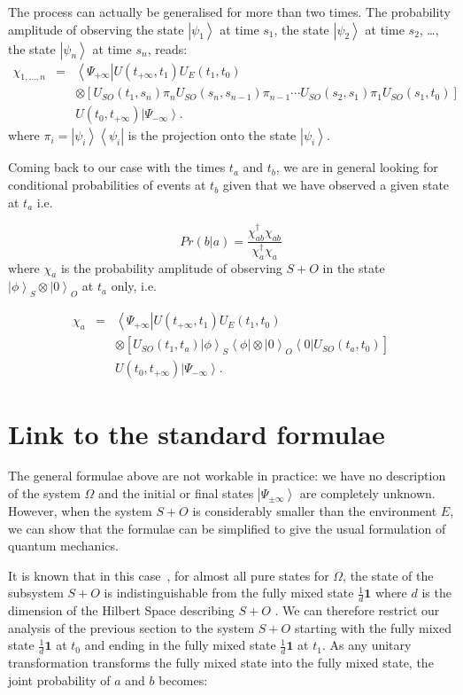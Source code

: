 \documentclass[11pt,amsmath,amssymb,latexsym,a4paper]{article}
\newcommand{\ket}[1]{\left|{#1}\right>}
\newcommand{\ketBasis}[2]{\left|{#1}\right>_{#2}}
\newcommand{\ketbraBasis}[3]{\left|{#1}\right>_{#3}\left<{#2}\right|}
\newcommand{\bra}[1]{\left<{#1}\right|}
\newcommand{\toshIdentity}{{\mathbf{1}}}
\begin{document}
The process can actually be generalised for more than two times. The probability amplitude of observing the state $\ket{\psi_1}$ at time $s_1$, the state $\ket{\psi_2}$ at time $s_2$, \ldots, the state $\ket{\psi_n}$ at time $s_n$, reads:
\begin{eqnarray} 
\chi_{1,\ldots,n}&=&\bra{\Psi_{+\infty}} U(t_{+\infty},t_1) U_E(t_1,t_0) \nonumber\\
&& \otimes [ U_{SO}(t_1,s_n) \pi_n U_{SO}(s_n, s_{n-1}) \pi_{n-1}\cdots U_{SO}(s_2, s_1) \pi_{1} U_{SO}(s_1,t_0)] \nonumber\\
&&   U(t_0,t_{+\infty}) \ket{\Psi_{-\infty}}.
\end{eqnarray} 
where $\pi_i=\ket{\psi_i}\bra{\psi_i}$ is the projection onto the state $\ket{\psi_i}$.

Coming back to our case with the times $t_a$ and $t_b$, we are in general looking for conditional probabilities of events at $t_b$ given that we have observed a given state at $t_a$ i.e.

\begin{equation}
Pr(b | a) = \frac{\chi_{a b}^\dag\chi_{a b}}{\chi_{a}^\dag\chi_{a}}
\end{equation}
where $\chi_{a}$ is the probability amplitude of observing $S+O$ in the state $\ketBasis{\phi}{S}\otimes\ketBasis{0}{O}$ at $t_a$ only, i.e.

\begin{eqnarray} 
\chi_{a}&=&\bra{\Psi_{+\infty}} U(t_{+\infty},t_1) U_E(t_1,t_0) \nonumber\\
&& \otimes [ U_{SO}(t_1,t_a) \ketbraBasis{\phi}{\phi}{S}\otimes\ketbraBasis{0}{0}{O}U_{SO}(t_a,t_0)] \nonumber\\
&&   U(t_0,t_{+\infty}) \ket{\Psi_{-\infty}}.
\end{eqnarray} 

\section{Link to the standard formulae}
The general formulae above are not workable in practice: we have no description of the system $\Omega$ and the initial or final states $\ket{\Psi_{\pm\infty}}$ are completely unknown.
However, when the system $S+O$ is considerably smaller than the environment $E$, we can show that the formulae can be simplified to give the usual formulation of quantum mechanics.

It is known that in this case~\cite{Popescu06}, for almost all pure states for $\Omega$, the state of the subsystem $S+O$ is indistinguishable from the fully mixed state $\frac{1}{d}\toshIdentity$ where $d$ is the dimension of the Hilbert Space describing $S+O$ . We can therefore restrict our analysis of the previous section to the system $S+O$ starting with the fully mixed state  $\frac{1}{d}\toshIdentity$ at $t_0$ and ending in the fully mixed state  $\frac{1}{d}\toshIdentity$ at $t_1$. As any unitary transformation transforms the fully mixed state into the fully mixed state, the joint probability of $a$ and $b$ becomes:
\end{document}
